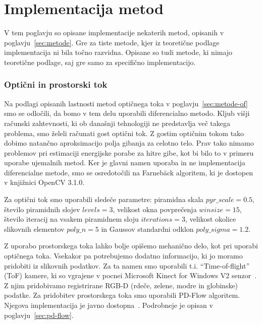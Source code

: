 \chapter{Implementacija metod}
V tem poglavju so opisane implementacije nekaterih metod, opisanih v poglavju~\ref{sec:metode}. Gre za tiste metode, kjer iz teoretične podlage implementacija ni bila točno razvidna. Opisane so tudi metode, ki nimajo teoretične podlage, saj gre samo za specifično implementacijo.

\subsection{Optični in prostorski tok}
Na podlagi opisanih lastnosti metod optičnega toka v poglavju~\ref{sec:metode-of} smo se odločili, da bomo v tem delu uporabili diferencialno metodo. Kljub višji računski zahtevnosti, ki ob današnji tehnologiji ne predstavlja več takega problema, smo želeli računati gost optični tok. Z gostim optičnim tokom tako dobimo natančno aproksimacijo polja gibanja za celotno telo. Prav tako nimamo problemov pri estimaciji energijske porabe za hitre gibe, kot bi bilo to v primeru uporabe ujemalnih metod. Ker je glavni namen uporaba in ne implementacija diferencialne metode, smo se osredotočili na Farneb{\"a}ck algoritem, ki je dostopen v knjižnici OpenCV 3.1.0.

Za optični tok smo uporabili sledeče parametre: piramidna skala $pyr\_scale=\num{0.5}$, število piramidnih slojev $levels=3$, velikost okna povprečenja $winsize=15$, število iteracij na vsakem piramidnem sloju $iterations=3$, velikost okolice slikovnih elementov $poly\_n=5$ in Gaussov standardni odklon $poly\_sigma=\num{1.2}$.

Z uporabo prostorskega toka lahko bolje opišemo mehanično delo, kot pri uporabi optičnega toka. Vsekakor pa potrebujemo dodatno informacijo, ki jo moramo pridobiti iz slikovnih podatkov. Za ta namen smo uporabili t.i. ``Time-of-flight'' (ToF) kamere, ki so vgrajene v pocnei Microsoft Kinect for Windows V2 senzor~\cite{Yang2015KinectV2}. Z njim pridobivamo registrirane RGB-D (rdeče, zelene, modre in globinske) podatke. Za pridobitev prostorskega toka smo uporabili PD-Flow algoritem. Njegova implementacija je javno dostopna~\cite{jaimez2015primal}. Podrobneje je opisan v poglavju~\ref{sec:pd-flow}.



